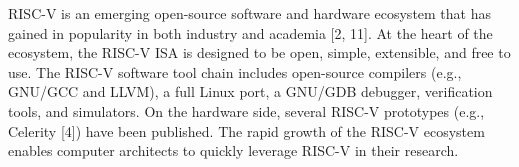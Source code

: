 
\label{sec:bak}
RISC-V is an emerging open-source software and hardware ecosystem that has gained in popularity in both industry and academia [2, 11]. At the heart of the ecosystem, the RISC-V ISA is designed to be open, simple, extensible, and free to use. The RISC-V software tool chain includes open-source compilers (e.g., GNU/GCC and LLVM), a full Linux port, a GNU/GDB debugger, verification tools, and simulators. On the hardware side, several RISC-V prototypes (e.g., Celerity [4]) have been published. The rapid growth of the RISC-V ecosystem enables computer architects to quickly leverage RISC-V in their research.


